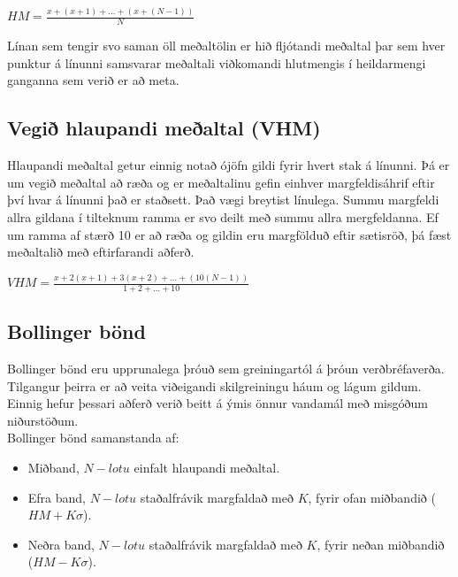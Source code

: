 \documentclass{article}
\begin{document}
\begin{center}
  $HM = \frac{x+(x+1)+\dots+(x+(N-1))}{N}$ 
\end{center}


Línan sem tengir svo saman öll meðaltölin er hið
fljótandi meðaltal þar sem hver punktur á línunni
samsvarar 
meðaltali viðkomandi hlutmengis í heildarmengi ganganna
sem verið er að meta. 
 
\subsection{Vegið hlaupandi meðaltal (VHM)}
\label{sec:weighted_running_average}
Hlaupandi meðaltal getur einnig notað ójöfn gildi fyrir
hvert stak á línunni.
Þá er um vegið meðaltal að ræða og er meðaltalinu gefin
einhver margfeldisáhrif eftir því hvar á línunni það er
staðsett. 
Það vægi breytist línulega. Summu margfeldi allra
gildana í tilteknum ramma er svo deilt með summu allra
mergfeldanna. 
Ef um ramma af stærð 10 er að ræða og gildin eru
margfölduð eftir sætisröð, þá fæst meðaltalið með eftirfarandi aðferð. 
\begin{center}
  $VHM = \frac{x+2(x+1)+3(x+2)+\dots+(10(N-1))}{1+2+\dots+10}$ 
\end{center}


\subsection{Bollinger bönd}
\label{sec:bollinger_bands}


Bollinger bönd eru upprunalega þróuð sem greiningartól
á þróun verðbréfaverða. 
Tilgangur þeirra er að veita viðeigandi skilgreiningu háum og lágum gildum.
Einnig hefur þessari 
aðferð verið beitt á ýmis önnur vandamál með misgóðum niðurstöðum. \\

Bollinger bönd samanstanda af:
\begin{itemize}
  \item Miðband, $N-lotu$ einfalt hlaupandi meðaltal.
  \item Efra band, $N-lotu$ staðalfrávik margfaldað með $K$, fyrir ofan
miðbandið ($HM + K\sigma$).
  \item Neðra band, $N-lotu$ staðalfrávik margfaldað með $K$, fyrir neðan
miðbandið ($HM -K\sigma$).
\end{itemize}
\end{document}
